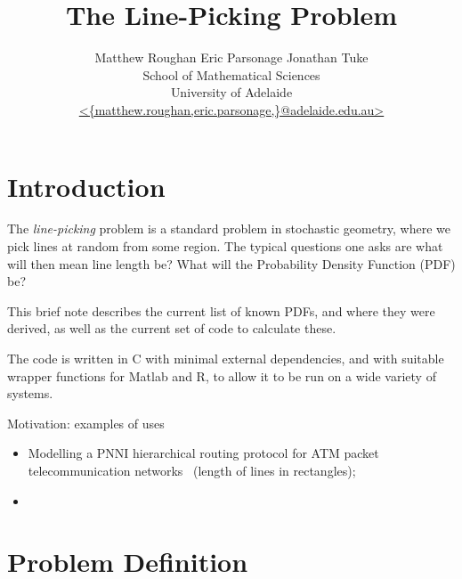 \documentclass{article}
\newcommand{\titlestr}{The Line-Picking Problem}
\begin{document}
\title{\titlestr}
\author{Matthew Roughan \;\;\; Eric Parsonage \;\;\; Jonathan Tuke \\
 School of Mathematical Sciences \\
 University of Adelaide \\
 \url{ <{matthew.roughan,eric.parsonage,}@adelaide.edu.au> } }
\maketitle

\begin{abstract}

\end{abstract}

\section{Introduction}

The {\em line-picking} problem is a standard problem in stochastic
geometry, where we pick lines at random from some region. The typical
questions one asks are what will then mean line length be? What will
the Probability Density Function (PDF) be?

This brief note describes the current list of known PDFs, and where
they were derived, as well as the current set of code to calculate
these. 

The code is written in C with minimal external dependencies, and with
suitable wrapper functions for Matlab and R, to allow it to be run on
a wide variety of systems.



Motivation: examples of uses
\begin{itemize}

\item Modelling a PNNI hierarchical routing protocol for ATM packet
  telecommunication networks~\cite{Rosenberg200499} (length of lines
  in rectangles);

\item 

\end{itemize}

\section{Problem Definition}
\end{document}
